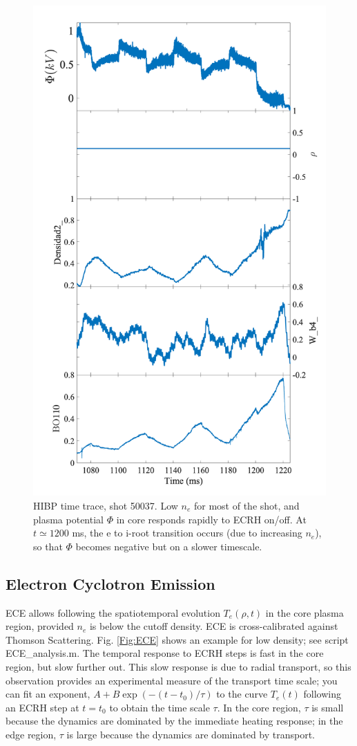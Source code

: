 \documentclass[preprint,12pt,authoryear]{elsarticle}
\begin{document}
\begin{figure}[!ht]
\centering
   \includegraphics[width=0.7\columnwidth]{Images/HIBP_50037.png}
   \caption{HIBP time trace, shot 50037. Low $n_e$ for most of the shot, and plasma potential $\Phi$ in core responds rapidly to ECRH on/off. At $t\simeq 1200$ ms, the e to i-root transition occurs (due to increasing $n_e$), so that $\Phi$ becomes negative but on a slower timescale.}
   \label{Fig:HIBP_50037}
\end{figure}

\clearpage
\subsection{Electron Cyclotron Emission}

ECE allows following the spatiotemporal evolution $T_e(\rho,t)$ in the core plasma region, provided $n_e$
is below the cutoff density.
ECE is cross-calibrated against Thomson Scattering.
Fig. \ref{Fig:ECE} shows an example for low density; see script ECE\_analysis.m.
The temporal response to ECRH steps is fast in the core region, but slow further out.
This slow response is due to radial transport, so this observation provides an experimental measure of the transport time scale; you can fit an exponent, $A + B\exp(-(t-t_0)/\tau)$ to the curve $T_e(t)$ following an ECRH step at $t=t_0$ to obtain the time scale $\tau$.
In the core region, $\tau$ is small because the dynamics are dominated by the immediate heating response; in the edge region, $\tau$ is large because the dynamics are dominated by transport.
\end{document}
